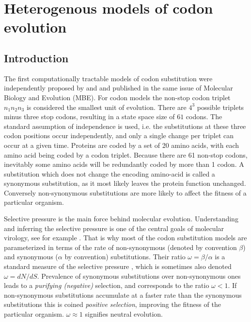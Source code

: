 \section{Heterogenous models of codon evolution\label{sub:dpp}}

\subsection{Introduction}

The first computationally tractable models of codon substitution were independently proposed by \cite{Muse1994} and \cite{Goldman1994} and published in the same issue of Molecular Biology and Evolution (MBE).
For codon models the non-stop codon triplet $n_{1}n_{2}n_{3}$ is considered the smallest unit of evolution.
There are $4^3$ possible triplets minus three stop codons, resulting in a state space size of $61$ codons.
The standard assumption of independence is used, i.e. the substitutions at these three codon positions occur independently, and only a single change per triplet can occur at a given time. 
Proteins are coded by a set of 20 amino acids, with each amino acid being coded by a codon triplet. 
Because there are 61 non-stop codons, inevitably some amino acids will be redundantly coded by more than 1 codon.
A substitution which does not change the encoding amino-acid is called a synonymous substitution, as it most likely leaves the protein function unchanged.
Conversely non-synonymous substitutions are more likely to affect the fitness of a particular organism.

Selective pressure is the main force behind molecular evolution.
Understanding and inferring the selective pressure is one of the central goals of molecular virology, see for example \citet{Bielejec2014a}.
That is why most of the codon substitution models are parameterized in terms of the rate of non-synonymous (denoted by convention $\beta$) and synonymous ($\alpha$ by convention) substitutions.
Their ratio $\omega=\beta / \alpha$ is a standard measure of the selective pressure \citep{ThePhylogeneticHandbook}, which is sometimes also denoted $\omega = dN/dS$.
Prevalence of synonymous substitutions over non-synonymous ones leads to a \emph{purifying (negative)} selection, and corresponds to the ratio $\omega <1$.
If non-synonymous substitutions accumulate at a faster rate than the synonymous substitutions this is coined \emph{positive selection}, improving the fitness of the particular organism.
$\omega\approx 1$ signifies neutral evolution.

